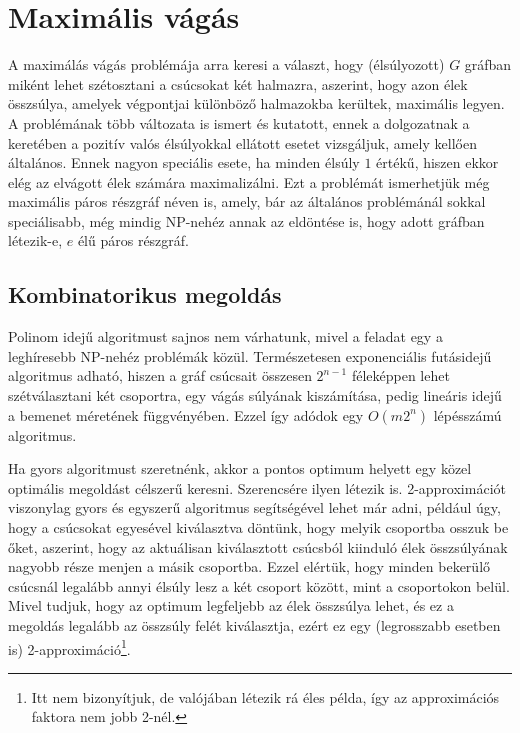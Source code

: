 \section{Maximális vágás}\label{sec:theoryMaxCut}

A maximálás vágás problémája arra keresi a választ, hogy (élsúlyozott) $G$ gráfban miként lehet szétosztani a csúcsokat két halmazra, aszerint, hogy azon élek összsúlya, amelyek végpontjai különböző halmazokba kerültek, maximális legyen. A problémának több változata is ismert és kutatott, ennek a dolgozatnak a keretében a pozitív valós élsúlyokkal ellátott esetet vizsgáljuk, amely kellően általános. Ennek nagyon speciális esete, ha minden élsúly $1$ értékű, hiszen ekkor elég az elvágott élek számára maximalizálni. Ezt a problémát ismerhetjük még maximális páros részgráf néven is, amely, bár az általános problémánál sokkal speciálisabb, még mindig NP-nehéz annak az eldöntése is, hogy adott gráfban létezik-e, $e$ élű páros részgráf.

\subsection{Kombinatorikus megoldás}\label{sec:theoryMaxCutComb}

Polinom idejű algoritmust sajnos nem várhatunk, mivel a feladat egy a leghíresebb NP-nehéz problémák közül. Természetesen exponenciális futásidejű algoritmus adható, hiszen a gráf csúcsait összesen $2^{n-1}$ féleképpen lehet szétválasztani két csoportra, egy vágás súlyának kiszámítása, pedig lineáris idejű a bemenet méretének függvényében. Ezzel így adódok egy $O(m 2^n)$ lépésszámú algoritmus.

Ha gyors algoritmust szeretnénk, akkor a pontos optimum helyett egy közel optimális megoldást célszerű keresni. Szerencsére ilyen létezik is. 2-approximációt viszonylag gyors és egyszerű algoritmus segítségével lehet már adni, például úgy, hogy a csúcsokat egyesével kiválasztva döntünk, hogy melyik csoportba osszuk be őket, aszerint, hogy az aktuálisan kiválasztott csúcsból kiinduló élek összsúlyának nagyobb része menjen a másik csoportba. Ezzel elértük, hogy minden bekerülő csúcsnál legalább annyi élsúly lesz a két csoport között, mint a csoportokon belül. Mivel tudjuk, hogy az optimum legfeljebb az élek összsúlya lehet, és ez a megoldás legalább az összsúly felét kiválasztja, ezért ez egy (legrosszabb esetben is) 2-approximáció\footnote{Itt nem bizonyítjuk, de valójában létezik rá éles példa, így az approximációs faktora nem jobb 2-nél.}.

